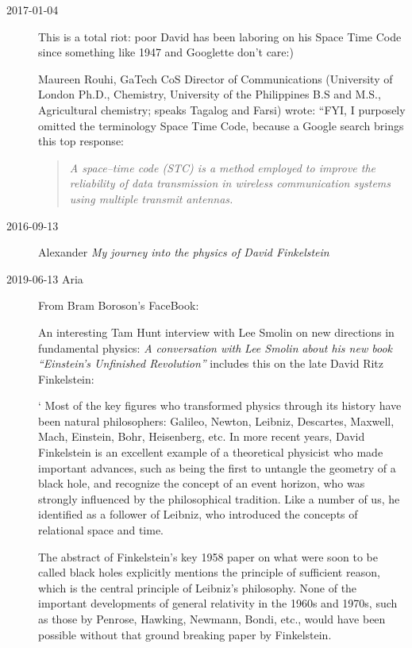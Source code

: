 \begin{description}
\item[2017-01-04]
This is a total riot: poor David has been laboring on his Space Time Code
since something like 1947 and Googlette don't care:)


 {Maureen Rouhi},
GaTech CoS Director of Communications (University of London
Ph.D., Chemistry, University of the Philippines
B.S and M.S., Agricultural chemistry; speaks Tagalog and Farsi)
wrote:
``FYI, I purposely omitted the terminology Space Time Code, because a
Google search brings this top response:

\begin{quote}
{\em A space–time code (STC) is a method employed to improve the
reliability of data transmission in wireless communication systems using
multiple transmit antennas.}
\end{quote}

\item[2016-09-13]
Alexander
{\em My journey into the physics of {David Finkelstein}}

\item[2019-06-13 Aria] From Bram Boroson's FaceBook:

An interesting Tam Hunt interview with Lee Smolin on new directions in
fundamental physics: \emph{A conversation with}
{\emph{Lee Smolin}} \emph{about his new book ``Einstein's Unfinished
Revolution''} includes this on the late David Ritz Finkelstein:

`
Most of the key figures who transformed physics through its history have
been natural philosophers: Galileo, Newton, Leibniz, Descartes, Maxwell,
Mach, Einstein, Bohr, Heisenberg, etc. In more recent years, David
Finkelstein is an excellent example of a theoretical physicist who made
important advances, such as being the first to untangle the geometry of a
black hole, and recognize the concept of an event horizon, who was
strongly influenced by the philosophical tradition. Like a number of us,
he identified as a follower of Leibniz, who introduced the concepts of
relational space and time.

The abstract of Finkelstein's key 1958 paper
on what were soon to be called black holes explicitly mentions the
principle of sufficient reason, which is the central principle of
Leibniz's philosophy. None of the important developments of general
relativity in the 1960s and 1970s, such as those by Penrose, Hawking,
Newmann, Bondi, etc., would have been possible without that
ground breaking paper by Finkelstein.


\end{description}
